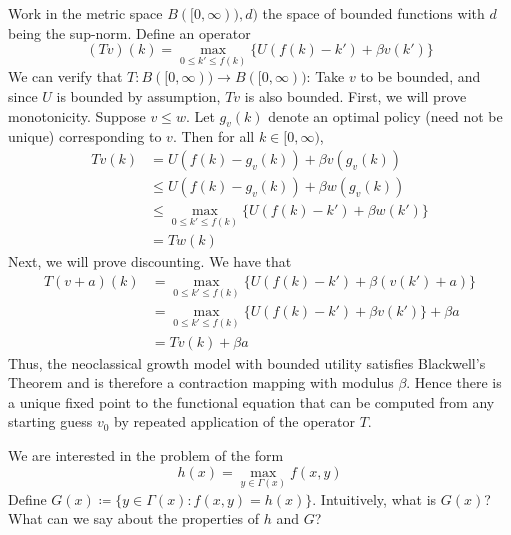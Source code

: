 \documentclass[10pt]{article}
\begin{document}
\begin{example}
	Work in the metric space $B([0,\infty)),d)$ the space of bounded functions with $d$ being the sup-norm. Define an operator
	\[
	(Tv)(k) = \max_{0 \le k' \le f(k)} \{U(f(k) - k') + \beta v(k')\}
	\]
	We can verify that $T: B([0,\infty)) \to B([0,\infty))$: Take $v$ to be bounded, and since $U$ is bounded by assumption, $Tv$ is also bounded. First, we will prove monotonicity. Suppose $v \le w$. Let $g_v(k)$ denote an optimal policy (need not be unique) corresponding to $v$. Then for all $k \in [0,\infty)$,
	\begin{align*}
		Tv(k) &= U(f(k) - g_v(k)) + \beta v(g_v(k)) \\
		&\le U(f(k) - g_v(k)) + \beta w(g_v(k)) \\
		&\le \max_{0 \le k' \le f(k)} \{U(f(k) - k') + \beta w(k')\} \\
		&= Tw(k)
	\end{align*}
	Next, we will prove discounting. We have that
	\begin{align*}
		T(v+a)(k) &= \max_{0 \le k' \le f(k)} \{U(f(k) - k') + \beta (v(k') + a)\} \\
		&=  \max_{0 \le k' \le f(k)} \{U(f(k) - k') + \beta v(k')\} + \beta a \\
		&= Tv(k) + \beta a
	\end{align*}
	Thus, the neoclassical growth model with bounded utility satisfies Blackwell's Theorem and is therefore a contraction mapping with modulus $\beta$. Hence there is a unique fixed point to the functional equation that can be computed from any starting guess $v_0$ by repeated application of the operator $T$.
\end{example}

We are interested in the problem of the form
\[
h(x) = \max_{y \in \Gamma(x)} f(x,y)
\]
Define $G(x) \coloneqq \{y \in \Gamma(x) : f(x,y) = h(x)\}$. Intuitively, what is $G(x)$? What can we say about the properties of $h$ and $G$?
\end{document}
